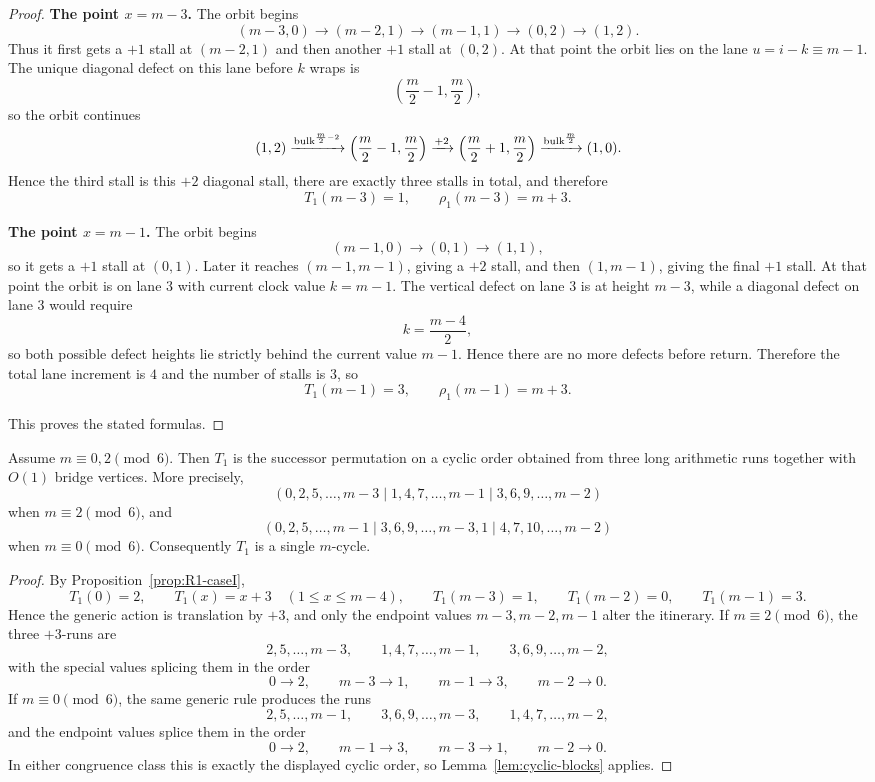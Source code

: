 \begin{proof}
\smallskip
\noindent\textbf{The point $x=m-3$.}
The orbit begins
\[
(m-3,0)\to (m-2,1)\to (m-1,1)\to (0,2)\to (1,2).
\]
Thus it first gets a $+1$ stall at $(m-2,1)$ and then another $+1$ stall at $(0,2)$.
At that point the orbit lies on the lane $u=i-k\equiv m-1$.
The unique diagonal defect on this lane before $k$ wraps is
\[
\left(\frac m2-1,\frac m2\right),
\]
so the orbit continues
\[
(1,2)\xrightarrow{\mathrm{bulk}^{\frac m2-2}}\left(\frac m2-1,\frac m2\right)
\xrightarrow{+2}\left(\frac m2+1,\frac m2\right)
\xrightarrow{\mathrm{bulk}^{\frac m2}}(1,0).
\]
Hence the third stall is this $+2$ diagonal stall, there are exactly three stalls in total, and therefore
\[
T_1(m-3)=1,\qquad \rho_1(m-3)=m+3.
\]

\smallskip
\noindent\textbf{The point $x=m-1$.}
The orbit begins
\[
(m-1,0)\to (0,1)\to (1,1),
\]
so it gets a $+1$ stall at $(0,1)$.
Later it reaches $(m-1,m-1)$, giving a $+2$ stall, and then $(1,m-1)$, giving the final $+1$ stall.
At that point the orbit is on lane $3$ with current clock value $k=m-1$.
The vertical defect on lane $3$ is at height $m-3$, while a diagonal defect on lane $3$ would require
\[
k=\frac{m-4}{2},
\]
so both possible defect heights lie strictly behind the current value $m-1$.
Hence there are no more defects before return.
Therefore the total lane increment is $4$ and the number of stalls is $3$, so
\[
T_1(m-1)=3,\qquad \rho_1(m-1)=m+3.
\]

This proves the stated formulas.
\end{proof}

\begin{proposition}\label{prop:R1-caseI-blocks}
Assume $m\equiv 0,2\pmod 6$.
Then $T_1$ is the successor permutation on a cyclic order obtained from three long arithmetic runs together with $O(1)$ bridge vertices.
More precisely,
\[
(0,2,5,\dots,m-3\mid 1,4,7,\dots,m-1\mid 3,6,9,\dots,m-2)
\]
when $m\equiv 2\pmod 6$, and
\[
(0,2,5,\dots,m-1\mid 3,6,9,\dots,m-3,1\mid 4,7,10,\dots,m-2)
\]
when $m\equiv 0\pmod 6$.
Consequently $T_1$ is a single $m$-cycle.
\end{proposition}

\begin{proof}
By Proposition~\ref{prop:R1-caseI},
\[
T_1(0)=2,\qquad T_1(x)=x+3\quad (1\le x\le m-4),\qquad T_1(m-3)=1,\qquad T_1(m-2)=0,\qquad T_1(m-1)=3.
\]
Hence the generic action is translation by $+3$, and only the endpoint values $m-3,m-2,m-1$ alter the itinerary.
If $m\equiv 2\pmod 6$, the three $+3$-runs are
\[
2,5,\dots,m-3,\qquad 1,4,7,\dots,m-1,\qquad 3,6,9,\dots,m-2,
\]
with the special values splicing them in the order
\[
0\to 2,\qquad m-3\to 1,\qquad m-1\to 3,\qquad m-2\to 0.
\]
If $m\equiv 0\pmod 6$, the same generic rule produces the runs
\[
2,5,\dots,m-1,\qquad 3,6,9,\dots,m-3,\qquad 1,4,7,\dots,m-2,
\]
and the endpoint values splice them in the order
\[
0\to 2,\qquad m-1\to 3,\qquad m-3\to 1,\qquad m-2\to 0.
\]
In either congruence class this is exactly the displayed cyclic order, so Lemma~\ref{lem:cyclic-blocks} applies.
\end{proof}

